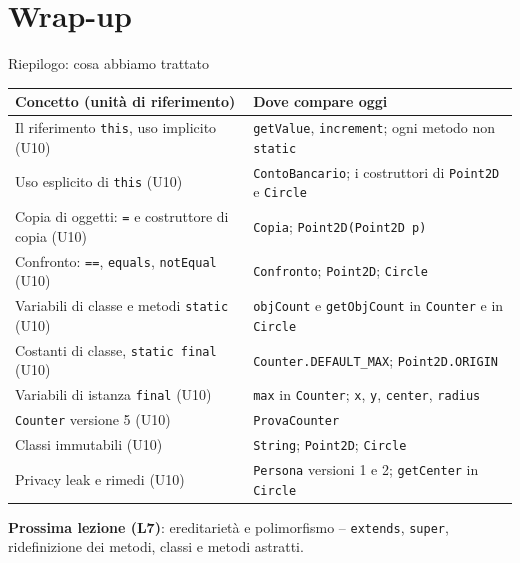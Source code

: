 \documentclass[10pt,aspectratio=169]{beamer}
\begin{document}
\section{Wrap-up}

\begin{frame}{Riepilogo: cosa abbiamo trattato}
\footnotesize
\begin{center}
\renewcommand{\arraystretch}{1.25}
\begin{tabular}{|l|l|}
\hline
\textbf{Concetto (unità di riferimento)} & \textbf{Dove compare oggi} \\
\hline
Il riferimento \texttt{this}, uso implicito (U10) & \texttt{getValue}, \texttt{increment}; ogni metodo non \texttt{static} \\
\hline
Uso esplicito di \texttt{this} (U10) & \texttt{ContoBancario}; i costruttori di \texttt{Point2D} e \texttt{Circle} \\
\hline
Copia di oggetti: \texttt{=} e costruttore di copia (U10) & \texttt{Copia}; \texttt{Point2D(Point2D p)} \\
\hline
Confronto: \texttt{==}, \texttt{equals}, \texttt{notEqual} (U10) & \texttt{Confronto}; \texttt{Point2D}; \texttt{Circle} \\
\hline
Variabili di classe e metodi \texttt{static} (U10) & \texttt{objCount} e \texttt{getObjCount} in \texttt{Counter} e in \texttt{Circle} \\
\hline
Costanti di classe, \texttt{static final} (U10) & \texttt{Counter.DEFAULT\_MAX}; \texttt{Point2D.ORIGIN} \\
\hline
Variabili di istanza \texttt{final} (U10) & \texttt{max} in \texttt{Counter}; \texttt{x}, \texttt{y}, \texttt{center}, \texttt{radius} \\
\hline
\texttt{Counter} versione 5 (U10) & \texttt{ProvaCounter} \\
\hline
Classi immutabili (U10) & \texttt{String}; \texttt{Point2D}; \texttt{Circle} \\
\hline
Privacy leak e rimedi (U10) & \texttt{Persona} versioni 1 e 2; \texttt{getCenter} in \texttt{Circle} \\
\hline
\end{tabular}
\end{center}

\vspace{0.1cm}
\textbf{Prossima lezione (L7)}: ereditarietà e polimorfismo -- \texttt{extends}, \texttt{super}, ridefinizione dei metodi, classi e metodi astratti.
\end{frame}
\end{document}

